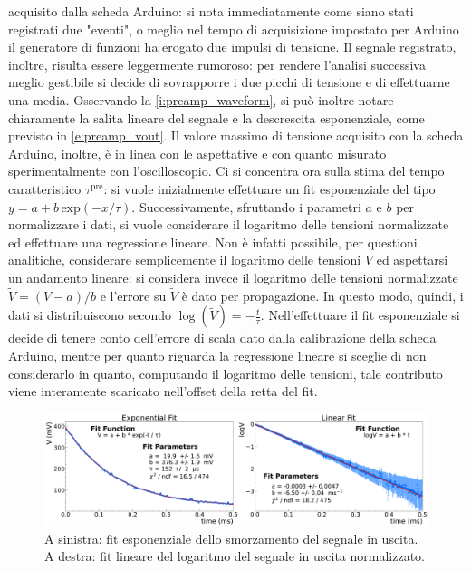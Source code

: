 \documentclass[a4paper,11pt]{article} %
\begin{document}
\noindent  acquisito dalla scheda Arduino: si nota immediatamente come siano stati registrati due "eventi", o
meglio nel tempo di acquisizione impostato per Arduino il generatore di funzioni ha erogato due impulsi di tensione. Il
segnale registrato, inoltre, risulta essere leggermente rumoroso: per rendere l'analisi successiva meglio gestibile si
decide di sovrapporre i due picchi di tensione e di effettuarne una media. Osservando la \autoref{i:preamp_waveform}, si
può inoltre notare chiaramente la salita lineare del segnale e la descrescita esponenziale, come previsto in
\autoref{e:preamp_vout}. Il valore massimo di tensione acquisito con la scheda Arduino, inoltre, è in linea con le
aspettative e con quanto misurato sperimentalmente con l'oscilloscopio. Ci si concentra ora sulla stima del tempo
caratteristico $\tau^{\text{pre}}$: si vuole inizialmente effettuare un fit esponenziale del tipo $y = a +
b\,\text{exp}(-x/\tau)$. Successivamente, sfruttando i parametri $a$ e $b$ per normalizzare i dati, si vuole considerare
il logaritmo delle tensioni normalizzate ed effettuare una regressione lineare. Non è infatti possibile, per questioni
analitiche, considerare semplicemente il logaritmo delle tensioni $V$ ed aspettarsi un andamento lineare: si considera
invece il logaritmo delle tensioni normalizzate $\tilde{V} = (V-a)/b$ e l'errore su $\tilde{V}$ è dato per propagazione.
In questo modo, quindi, i dati si distribuiscono secondo $\log(\tilde{V})= -\frac{t}{\tau}$. Nell'effettuare il fit
esponenziale si decide di tenere conto dell'errore di scala dato dalla calibrazione della scheda Arduino, mentre per
quanto riguarda la regressione lineare si sceglie di non considerarlo in quanto, computando il logaritmo delle
tensioni, tale contributo viene interamente scaricato nell'offset della retta del fit. 
\begin{figure}[H]
	\centering
	\includegraphics[width=\linewidth]{../Plots/PreAmp/preamp_arduino_fit.png}
	\caption{\small A sinistra: fit esponenziale dello smorzamento del segnale in uscita. 
					A destra: fit lineare del logaritmo del segnale in uscita normalizzato.}
	\label{i:preamp_arduino_fit}
\end{figure}
\end{document}
